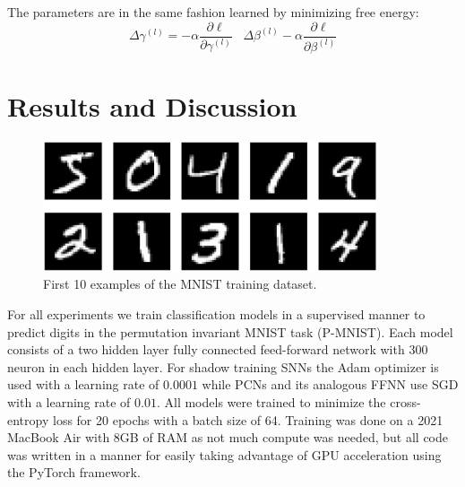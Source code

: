 \documentclass[a4paper,11pt]{article} %
\begin{document}
The parameters are in the same fashion learned by minimizing free energy:
\begin{equation}
  \Delta \gamma^{(l)} = -\alpha \frac{\partial \ell}{\partial \gamma^{(l)}} \hspace{10pt} \Delta \beta^{(l)} -\alpha \frac{\partial \ell}{\partial \beta^{(l)}}
\end{equation}


\newpage

\section{Results and Discussion}
\begin{figure}[ht]
  \centering
  \includegraphics[width=280pt]{graphics/mnist.png}  
  \caption{First 10 examples of the MNIST training dataset.}
  \label{fig:MNIST}
\end{figure}
For all experiments we train classification models in a supervised manner to predict digits in the permutation invariant MNIST task (P-MNIST). Each model consists of a two hidden layer fully connected feed-forward network with 300 neuron in each hidden layer. For shadow training SNNs the Adam optimizer is used with a learning rate of $0.0001$ while PCNs and its analogous FFNN use SGD with a learning rate of $0.01$. All models were trained to minimize the cross-entropy loss for 20 epochs with a batch size of 64. Training was done on a 2021 MacBook Air with 8GB of RAM as not much compute was needed, but all code was written in a manner for easily taking advantage of GPU acceleration using the PyTorch framework. 
\end{document}
